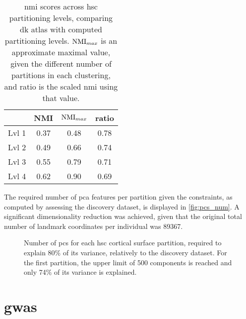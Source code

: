 \begin{table}[H]
	\centering
	\begin{tabular}{l|ccc}
		& NMI & $\operatorname*{NMI}_{max}$ & ratio\\
		\hline
		 Lvl 1 & 0.37 & 0.48 & 0.78\\
		 Lvl 2 & 0.49 & 0.66 & 0.74\\
		 Lvl 3 & 0.55 & 0.79 & 0.71\\
		 Lvl 4 & 0.62 & 0.90 & 0.69\\
	\end{tabular}
\caption [\Ac{nmi} scores across \ac{hsc} partitioning levels]{\Ac{nmi} scores across \ac{hsc} partitioning levels, comparing \ac{dk} atlas with computed partitioning levels. $\operatorname*{NMI}_{max}$ is an approximate maximal value, given the different number of partitions in each clustering, and ratio is the scaled \ac{nmi} using that value.}
\label{tab:nmi}
\end{table}
The required number of \ac{pca} features per partition given the constraints, as computed by assessing the discovery dataset, is displayed in \autoref{fig:pcs_num}. A significant dimensionality reduction was achieved, given that the original total number of landmark coordinates per individual was 89367.
\begin{figure}[H]

\caption[Number of PCs per HSC cortical surface partition]{Number of \acp{pc} for each \ac{hsc} cortical surface partition, required to explain 80\% of its variance, relatively to the discovery dataset. For the first partition, the upper limit of 500 components is reached and only 74\% of its variance is explained.}
\label{fig:pcs_num}
\end{figure}
\section{\ac{gwas}}

